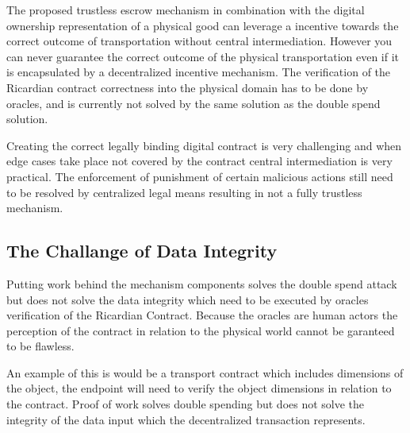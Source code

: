 
The proposed trustless escrow mechanism in combination with the digital ownership representation of a physical good can leverage a incentive towards the correct outcome of transportation without central intermediation. However you can never guarantee the correct outcome of the physical transportation even if it is encapsulated by a decentralized incentive mechanism. The verification of the Ricardian contract correctness into the physical domain has to be done by oracles, and is currently not solved by the same solution as the double spend solution.\par
Creating the correct legally binding digital contract is very challenging and when edge cases take place not covered by the contract central intermediation is very practical. The enforcement of punishment of certain malicious actions still need to be resolved by centralized legal means resulting in not a fully trustless mechanism. \par

\subsection{The Challange of Data Integrity}

Putting work behind the mechanism components solves the double spend attack but does not solve the data integrity which need to be executed by oracles verification of the Ricardian Contract. Because the oracles are human actors the perception of the contract in relation to the physical world cannot be garanteed to be flawless. \par
An example of this is would be a transport contract which includes dimensions of the object, the endpoint will need to verify the object dimensions in relation to the contract. Proof of work solves double spending but does not solve the integrity of the data input which the decentralized transaction represents.

